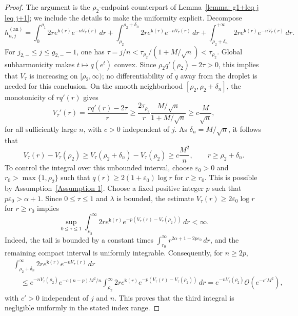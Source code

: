 \documentclass[a4paper]{article}
\numberwithin{equation}{section}
\begin{document}
\begin{proof}
The argument is the $\rho_2$-endpoint counterpart of Lemma~\ref{lemma: g1+leq j leq j+1}; we include the details to make the uniformity explicit. Decompose
\[
h_{n,j}^{(\mathrm{an})}
=
\int_0^{\rho_1}2r e^{\mathsf{k}(r)}e^{-nV_{\tau}(r)}\,dr
+
\int_{\rho_2}^{\rho_2+\delta_n}2r e^{\mathsf{k}(r)}e^{-nV_{\tau}(r)}\,dr
+
\int_{\rho_2+\delta_n}^{+\infty}2r e^{\mathsf{k}(r)}e^{-nV_{\tau}(r)}\,dr. 
\]
For $j_{2,-}\leq j\leq g_{2,-}-1$, one has
$\tau=j/n<\tau_{\rho_2}/(1+M/\sqrt n)<\tau_{\rho_2}$.
Global subharmonicity makes $t\mapsto q(e^t)$ convex.  Since
$\rho_2q'(\rho_2)-2\tau>0$, this implies that $V_\tau$ is increasing on
$[\rho_2,\infty)$; no differentiability of $q$ away from the droplet is
needed for this conclusion.  On the smooth neighborhood
$[\rho_2,\rho_2+\delta_n]$, the monotonicity of $rq'(r)$ gives
\[
V_\tau'(r)
=\frac{rq'(r)-2\tau}{r}
\geq\frac{2\tau_{\rho_2}}{r}
\frac{M/\sqrt n}{1+M/\sqrt n}
\geq c\frac{M}{\sqrt n},
\]
for all sufficiently large $n$, with $c>0$ independent of $j$.
As $\delta_n=M/\sqrt n$, it follows that
\[
V_\tau(r)-V_\tau(\rho_2)
\geq V_\tau(\rho_2+\delta_n)-V_\tau(\rho_2)
\geq c\frac{M^2}{n},\qquad r\geq\rho_2+\delta_n.
\]
To control the integral over this unbounded interval, choose $\varepsilon_0>0$
and $r_0>\max\{1,\rho_2\}$ such that
$q(r)\geq2(1+\varepsilon_0)\log r$ for $r\geq r_0$.
This is possible by Assumption~\ref{Assumption 1}.
Choose a fixed positive integer $p$ such that
$p\varepsilon_0>\alpha+1$.  Since $0\leq\tau\leq1$ and $\lambda$ is
bounded, the estimate $V_\tau(r)\geq2\varepsilon_0\log r$ for
$r\geq r_0$ implies
\[
\sup_{0\leq\tau\leq1}
\int_{\rho_2}^{\infty}
2r e^{\mathsf k(r)}
e^{-p(V_\tau(r)-V_\tau(\rho_2))}\,dr<\infty.
\]
Indeed, the tail is bounded by a constant times
$\int_{r_0}^{\infty}r^{2\alpha+1-2p\varepsilon_0}\,dr$, and the
remaining compact interval is uniformly integrable.
Consequently, for $n\geq2p$,
\begin{align*}
&\int_{\rho_2+\delta_n}^{\infty}
2r e^{\mathsf k(r)}e^{-nV_\tau(r)}\,dr
\\
&\quad\leq e^{-nV_\tau(\rho_2)}
e^{-c(n-p)M^2/n}
\int_{\rho_2}^{\infty}
2r e^{\mathsf k(r)}
e^{-p(V_\tau(r)-V_\tau(\rho_2))}\,dr
=e^{-nV_\tau(\rho_2)}\mathcal O(e^{-c'M^2}),
\end{align*}
with $c'>0$ independent of $j$ and $n$.  This proves that the third
integral is negligible uniformly in the stated index range.


\end{proof}
\end{document}
